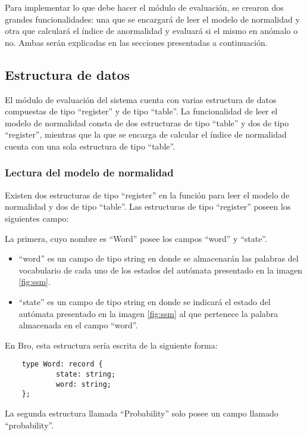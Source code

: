 Para implementar lo que debe hacer el módulo de evaluación, se crearon dos grandes funcionalidades: una que se encargará de leer el modelo de normalidad y  otra que calculará el índice de anormalidad y evaluará si el mismo en anómalo o no. Ambas serán explicadas en las secciones presentadas a continuación.

\subsection{Estructura de datos}

El módulo de evaluación del sistema cuenta con varias estructura de datos compuestas de tipo “register” y de tipo “table”. La funcionalidad de leer el modelo de normalidad consta de dos estructuras de tipo “table” y dos de tipo “register”, mientras que la que se encarga de calcular el índice de normalidad cuenta con una sola estructura de tipo “table”.

\subsubsection{Lectura del modelo de normalidad}
\label{sssec:estructuraModelo}

Existen dos estructuras de tipo “register” en la función para leer el modelo de normalidad y dos de tipo “table”.
Las estructuras de tipo “register” poseen los siguientes campo:

La primera, cuyo nombre es “Word” posee los campos “word” y  “state”.

\begin{itemize}
\item “word” es un campo de tipo string en donde se almacenarán las palabras del vocabulario de cada uno de los estados del autómata presentado en la imagen \ref{fig:ssm}.
\item “state” es un campo de tipo string en donde se indicará el estado del autómata presentado en la imagen \ref{fig:ssm} al que pertenece la palabra almacenada en el campo “word”.
\end{itemize}

En Bro, esta estructura sería escrita de la siguiente forma:

\begin{verbatim}
    type Word: record {
            state: string;
            word: string;
    };
\end{verbatim}

La segunda estructura llamada “Probability” solo posee un campo llamado “probability”.


